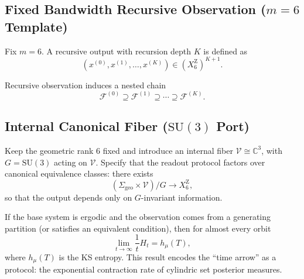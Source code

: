 \subsection{Fixed Bandwidth Recursive Observation (\texorpdfstring{$m=6$}{m=6} Template)}

\begin{definition}\label{def:recursive-output-seq-spec}
Fix $m=6$. A recursive output with recursion depth $K$ is defined as
$$
(x^{(0)},x^{(1)},\dots,x^{(K)})\in (X_6^{\mathrm Z})^{K+1}.
$$
\end{definition}

\begin{definition}\label{def:nested-fiber-chain-spec}
Recursive observation induces a nested chain
$$
\mathcal{F}^{(0)}\supseteq \mathcal{F}^{(1)}\supseteq \cdots \supseteq \mathcal{F}^{(K)}.
$$
\end{definition}

\subsection{Internal Canonical Fiber (\texorpdfstring{$\mathrm{SU}(3)$}{SU(3)} Port)}

\begin{definition}\label{def:su3-fiber-port}
Keep the geometric rank $6$ fixed and introduce an internal fiber $\mathcal{V}\cong\mathbb{C}^3$, with $G=\mathrm{SU}(3)$ acting on $\mathcal{V}$. Specify that the readout protocol factors over canonical equivalence classes: there exists
$$
(\Sigma_{\mathrm{geo}}\times\mathcal{V})/G\to X_6^{\mathrm Z},
$$
so that the output depends only on $G$-invariant information.
\end{definition}

\begin{theorem}\label{thm:smb-template}
If the base system is ergodic and the observation comes from a generating partition (or satisfies an equivalent condition), then for almost every orbit
\[
\lim_{t\to\infty}\frac{1}{t}H_t=h_\mu(T),
\]
where $h_\mu(T)$ is the KS entropy. This result encodes the ``time arrow'' as a protocol: the exponential contraction rate of cylindric set posterior measures.
\end{theorem}

